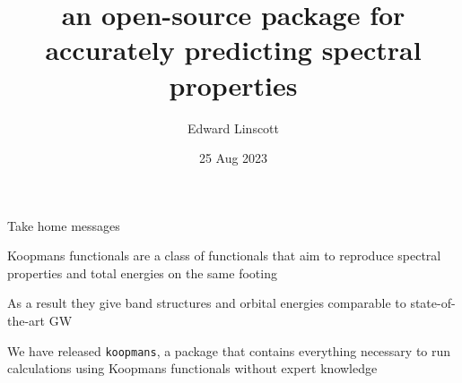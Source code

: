\documentclass[xcolor=table,aspectratio=169]{beamer}
\title{\noindent\large{an open-source package for accurately predicting spectral properties}}
\author{Edward Linscott}
\institute{EPFL}
\date{25 Aug 2023}
\numberwithin{equation}{section}
\begin{document}
\frame{\titlepage}

\begin{frame}{Take home messages}

   Koopmans functionals are a class of functionals that aim to reproduce spectral properties and total energies on the same footing

   \vspace{1em}
   As a result they give band structures and orbital energies comparable to state-of-the-art GW

   \vspace{1em}
   We have released \texttt{koopmans}, a package that contains everything necessary to run calculations using Koopmans functionals without expert knowledge



\end{frame}

\end{document}
